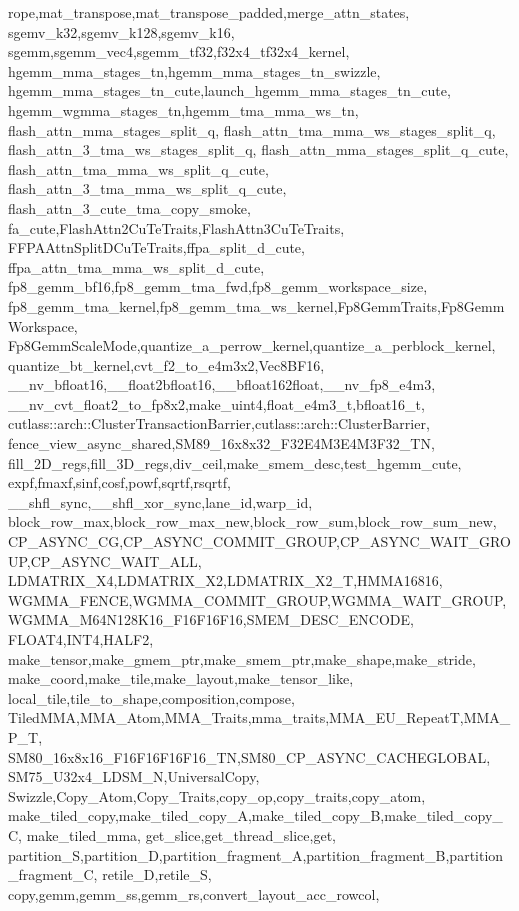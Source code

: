 {{    rope,mat_transpose,mat_transpose_padded,merge_attn_states,
    sgemv_k32,sgemv_k128,sgemv_k16,
    sgemm,sgemm_vec4,sgemm_tf32,f32x4_tf32x4_kernel,
    hgemm_mma_stages_tn,hgemm_mma_stages_tn_swizzle,
    hgemm_mma_stages_tn_cute,launch_hgemm_mma_stages_tn_cute,
    hgemm_wgmma_stages_tn,hgemm_tma_mma_ws_tn,
    flash_attn_mma_stages_split_q,
    flash_attn_tma_mma_ws_stages_split_q,
    flash_attn_3_tma_ws_stages_split_q,
    flash_attn_mma_stages_split_q_cute,
    flash_attn_tma_mma_ws_split_q_cute,
    flash_attn_3_tma_mma_ws_split_q_cute,
    flash_attn_3_cute_tma_copy_smoke,
    fa_cute,FlashAttn2CuTeTraits,FlashAttn3CuTeTraits,
    FFPAAttnSplitDCuTeTraits,ffpa_split_d_cute,
    ffpa_attn_tma_mma_ws_split_d_cute,
    fp8_gemm_bf16,fp8_gemm_tma_fwd,fp8_gemm_workspace_size,
    fp8_gemm_tma_kernel,fp8_gemm_tma_ws_kernel,Fp8GemmTraits,Fp8GemmWorkspace,
    Fp8GemmScaleMode,quantize_a_perrow_kernel,quantize_a_perblock_kernel,
    quantize_bt_kernel,cvt_f2_to_e4m3x2,Vec8BF16,
    __nv_bfloat16,__float2bfloat16,__bfloat162float,__nv_fp8_e4m3,
    __nv_cvt_float2_to_fp8x2,make_uint4,float_e4m3_t,bfloat16_t,
    cutlass::arch::ClusterTransactionBarrier,cutlass::arch::ClusterBarrier,
    fence_view_async_shared,SM89_16x8x32_F32E4M3E4M3F32_TN,
    fill_2D_regs,fill_3D_regs,div_ceil,make_smem_desc,test_hgemm_cute,
    expf,fmaxf,sinf,cosf,powf,sqrtf,rsqrtf,
    __shfl_sync,__shfl_xor_sync,lane_id,warp_id,
    block_row_max,block_row_max_new,block_row_sum,block_row_sum_new,
    CP_ASYNC_CG,CP_ASYNC_COMMIT_GROUP,CP_ASYNC_WAIT_GROUP,CP_ASYNC_WAIT_ALL,
    LDMATRIX_X4,LDMATRIX_X2,LDMATRIX_X2_T,HMMA16816,
    WGMMA_FENCE,WGMMA_COMMIT_GROUP,WGMMA_WAIT_GROUP,
    WGMMA_M64N128K16_F16F16F16,SMEM_DESC_ENCODE,
    FLOAT4,INT4,HALF2,
    make_tensor,make_gmem_ptr,make_smem_ptr,make_shape,make_stride,
    make_coord,make_tile,make_layout,make_tensor_like,
    local_tile,tile_to_shape,composition,compose,
    TiledMMA,MMA_Atom,MMA_Traits,mma_traits,MMA_EU_RepeatT,MMA_P_T,
    SM80_16x8x16_F16F16F16F16_TN,SM80_CP_ASYNC_CACHEGLOBAL,
    SM75_U32x4_LDSM_N,UniversalCopy,
    Swizzle,Copy_Atom,Copy_Traits,copy_op,copy_traits,copy_atom,
    make_tiled_copy,make_tiled_copy_A,make_tiled_copy_B,make_tiled_copy_C,
    make_tiled_mma,
    get_slice,get_thread_slice,get,
    partition_S,partition_D,partition_fragment_A,partition_fragment_B,partition_fragment_C,
    retile_D,retile_S,
    copy,gemm,gemm_ss,gemm_rs,convert_layout_acc_rowcol,
}}
